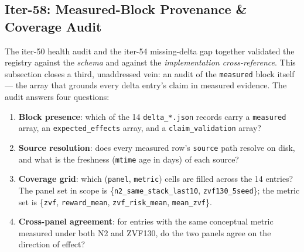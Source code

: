 \subsection{Iter-58: Measured-Block Provenance \& Coverage Audit}
\label{sec:p6-measured-coverage}

The iter-50 health audit and the iter-54 missing-delta gap together
validated the registry against the \emph{schema} and against the
\emph{implementation cross-reference}. This subsection closes a third,
unaddressed vein: an audit of the \texttt{measured} block itself---
the array that grounds every delta entry's claim in measured evidence.
The audit answers four questions:

\begin{enumerate}
\item \textbf{Block presence}: which of the 14 \texttt{delta\_*.json}
records carry a \texttt{measured} array, an \texttt{expected\_effects}
array, and a \texttt{claim\_validation} array?
\item \textbf{Source resolution}: does every measured row's
\texttt{source} path resolve on disk, and what is the freshness
(\texttt{mtime} age in days) of each source?
\item \textbf{Coverage grid}: which (\texttt{panel},
\texttt{metric}) cells are filled across the 14 entries? The panel set
in scope is \{\texttt{n2\_same\_stack\_last10},
\texttt{zvf130\_5seed}\}; the metric set is
\{\texttt{zvf}, \texttt{reward\_mean},
\texttt{zvf\_risk\_mean}, \texttt{mean\_zvf}\}.
\item \textbf{Cross-panel agreement}: for entries with the same
conceptual metric measured under both N2 and ZVF130, do the two
panels agree on the direction of effect?
\end{enumerate}

